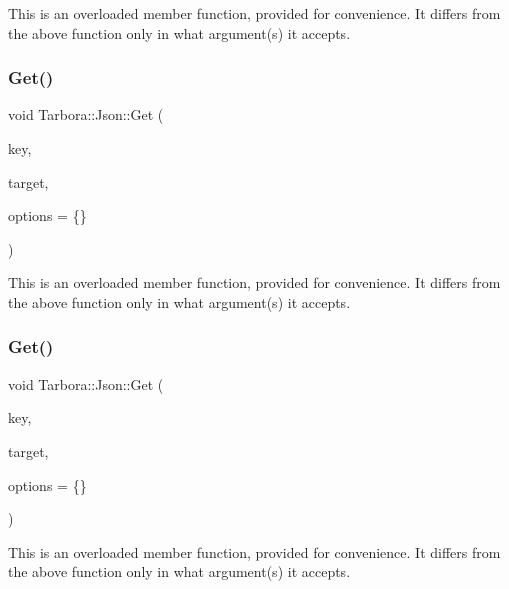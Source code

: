 This is an overloaded member function, provided for convenience. It differs from the above function only in what argument(s) it accepts. \mbox{\label{classTarbora_1_1Json_aeff932d4aebb4a9986af07f9cad26f81}} 
\subsubsection{\texorpdfstring{Get()}{Get()}\hspace{0.1cm}{\footnotesize\ttfamily [3/18]}}
{\footnotesize\ttfamily void Tarbora\+::\+Json\+::\+Get (\begin{DoxyParamCaption}\item[{const char $\ast$}]{key,  }\item[{int $\ast$}]{target,  }\item[{\hyperlink{structTarbora_1_1JsonOptions}{Json\+Options}}]{options = {\ttfamily \{\}} }\end{DoxyParamCaption})}

This is an overloaded member function, provided for convenience. It differs from the above function only in what argument(s) it accepts. \mbox{\label{classTarbora_1_1Json_a41659cc0b54206ba4a6594cc9f90c3e4}} 
\subsubsection{\texorpdfstring{Get()}{Get()}\hspace{0.1cm}{\footnotesize\ttfamily [4/18]}}
{\footnotesize\ttfamily void Tarbora\+::\+Json\+::\+Get (\begin{DoxyParamCaption}\item[{const char $\ast$}]{key,  }\item[{float $\ast$}]{target,  }\item[{\hyperlink{structTarbora_1_1JsonOptions}{Json\+Options}}]{options = {\ttfamily \{\}} }\end{DoxyParamCaption})}

This is an overloaded member function, provided for convenience. It differs from the above function only in what argument(s) it accepts. \mbox{\label{classTarbora_1_1Json_ac4c8151ef4bd84a31bcdd776f9307965}} 
